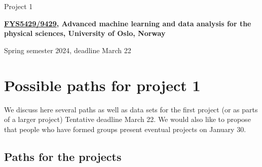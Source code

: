 \documentclass[%
oneside,                 %
final,                   %
10pt]{article}
\begin{document}

\newcommand{\exercisesection}[1]{\subsection*{#1}}






\thispagestyle{empty}

\begin{center}
{\LARGE\bf
\begin{spacing}{1.25}
Project 1
\end{spacing}
}
\end{center}


\begin{center}
{\bf \href{{https://www.uio.no/studier/emner/matnat/fys/FYS5429/index-eng.html}}{FYS5429/9429}, Advanced machine learning and data analysis for the physical sciences, University of Oslo, Norway${}^{}$} \\ [0mm]
\end{center}

\begin{center}
\end{center}
    

\begin{center}
Spring semester 2024, deadline March 22
\end{center}

\vspace{1cm}


\section*{Possible paths for project 1}

We discuss here several paths as well as data sets for the first project (or as parts of a larger project)
Tentative deadline March 22. We would also like to propose that people who have formed groups present eventual projects on January 30. 

\subsection*{Paths for the projects}
\end{document}
